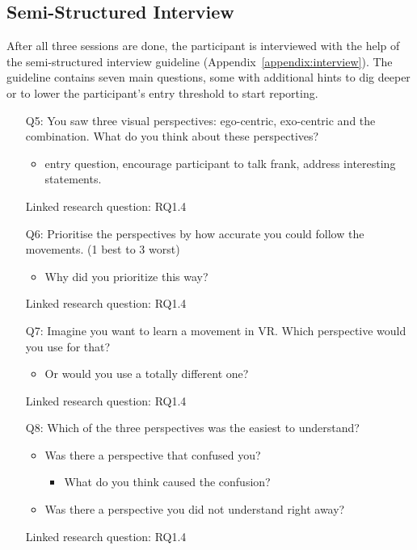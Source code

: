 \subsection{Semi-Structured Interview}
After all three sessions are done, the participant is interviewed with the help of the semi-structured interview guideline (Appendix~\ref{appendix:interview}). The guideline contains seven main questions, some with additional hints to dig deeper or to lower the participant's entry threshold to start reporting.
\begin{itemize}
	\item[Q5:] You saw three visual perspectives: ego-centric, exo-centric and the combination. What do you think about these perspectives?
	\begin{itemize}
		\item entry question, encourage participant to talk frank, address interesting statements.
	\end{itemize}
	\item[] Linked research question: RQ1.4
	
	\item[Q6:] Prioritise the perspectives by how accurate you could follow the movements. (1 best to 3 worst) 	
	\begin{itemize}
		\item Why did you prioritize this way?
	\end{itemize}
	\item[] Linked research question: RQ1.4
	
	\item[Q7:] Imagine you want to learn a movement in VR. Which perspective would you use for that?
	\begin{itemize}
		\item Or would you use a totally different one?
	\end{itemize}
	\item[] Linked research question: RQ1.4
	
	\item[Q8:] Which of the three perspectives was the easiest to understand? 
	\begin{itemize}
		\item Was there a perspective that confused you?
		\begin{itemize}
			\item What do you think caused the confusion?
		\end{itemize}
		\item Was there a perspective you did not understand right away?
	\end{itemize}
	\item[] Linked research question: RQ1.4
	

\end{itemize}
